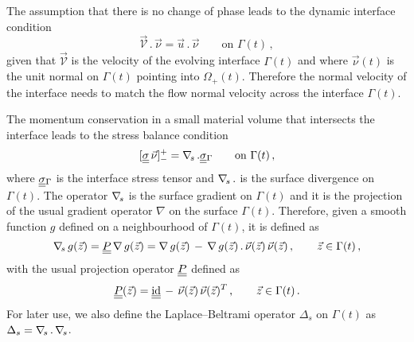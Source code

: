 The assumption that there is no change of phase leads to the dynamic interface
condition
\begin{equation} \label{eq:interface_velocity}
\vec{\mathcal{V}}\,.\,\vec\nu = \vec u\,.\,\vec \nu \qquad \mbox{on }
\Gamma(t)\,,
\end{equation}
given that $\vec{\mathcal{V}}$ is the velocity of the evolving interface
$\Gamma(t)$ and where $\vec\nu(t)$ is the unit normal on $\Gamma(t)$ pointing
into $\Omega_+(t)$. Therefore the normal velocity of the interface needs to
match the flow normal velocity across the interface $\Gamma(t)$.

The momentum conservation in a small material volume that intersects the
interface leads to the stress balance condition
\begin{equation}\label{eq:interface_jump_stress_div}
[\mat\sigma\,\vec \nu]_-^+ = \nabs\,.\mat\sigma_{\Gamma} \qquad \mbox{on }
\Gamma(t)\,,
\end{equation}
where $\mat\sigma_{\Gamma}$ is the interface stress tensor and $\nabla_{\!s}\,.$ is
the surface divergence on $\Gamma(t)$. The operator $\nabla_{\!s}$ is the surface
gradient on $\Gamma(t)$ and it is the projection of the usual gradient operator
$\nabla$ on the surface $\Gamma(t)$. Therefore, given a smooth function $g$
defined on a neighbourhood of $\Gamma(t)$, it is defined as
\begin{equation}\label{eq:surface_gradient}
\nabs\,g(\vec z)=\mat P\,\nabla\,g(\vec z)=\nabla\,g(\vec z)\,-
\,\nabla\,g(\vec z)\,.\,\vec\nu(\vec z)\,\vec\nu(\vec z)\,,\qquad \vec z
\in\Gamma(t)\,,
\end{equation}
with the usual projection operator $\mat P$ defined as
\begin{equation}\label{eq:surface_projection}
\mat P(\vec z)=\mat\id\,-\,\vec\nu(\vec z)\,\vec\nu(\vec z)^T\,,\qquad \vec
z\in \Gamma(t)\,.
\end{equation}
For later use, we also define the Laplace--Beltrami operator $\Delta_s$ on
$\Gamma(t)$ as $\Delta_s = \nabla_{\!s}\,.\,\nabla_{\!s}$.

